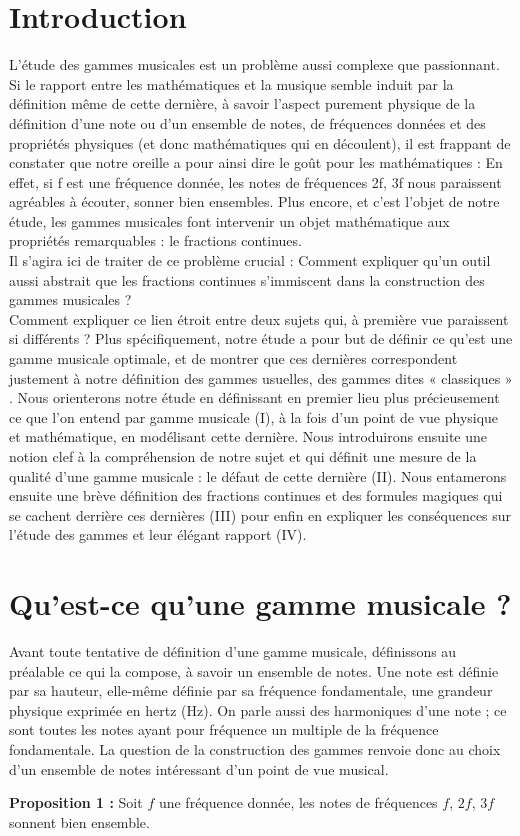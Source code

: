 \documentclass[moyen]{classeUPD}
\newenvironment{definition}{
	\begin{lrbox}{\tempbox}
		\begin{minipage}{\textwidth}
		}{
		\end{minipage}
	\end{lrbox}
	\begin{center}
		\fcolorbox[HTML]{222222}{EEEEEE}{
			\usebox{\tempbox}
		}
	\end{center}
}
\newcommand{\emf}[1]{\textbf{#1}}
\begin{document}
\chapter{Introduction}
L’étude des gammes musicales est un problème aussi complexe que passionnant. Si le rapport entre les mathématiques et la musique semble induit par la définition même de cette dernière, à savoir l’aspect purement physique de la définition d’une note ou d’un ensemble de notes, de fréquences données et des propriétés physiques (et donc mathématiques qui en découlent), il est frappant de constater que notre oreille a pour ainsi dire le goût pour les mathématiques : En effet, si f est une fréquence donnée, les notes de fréquences 2f, 3f nous paraissent agréables à écouter, sonner bien ensembles. Plus encore, et c’est l’objet de notre étude, les gammes musicales font intervenir un objet mathématique aux propriétés remarquables : le fractions continues.\\
Il s’agira ici de traiter de ce problème crucial : Comment expliquer qu’un outil aussi abstrait que les fractions continues s’immiscent dans la construction des gammes musicales ?\\
Comment expliquer ce lien étroit entre deux sujets qui, à première vue paraissent si différents ? Plus spécifiquement, notre étude a pour but de définir ce qu’est une gamme musicale optimale, et de montrer que ces dernières correspondent justement à notre définition des gammes usuelles, des gammes dites « classiques »  . Nous orienterons notre étude en définissant en premier lieu plus précieusement ce que l’on entend par gamme musicale (I), à la fois d’un point de vue physique et mathématique, en modélisant cette dernière. Nous introduirons ensuite une notion clef à la compréhension de notre sujet et qui définit une mesure de la qualité d’une gamme musicale : le défaut de cette dernière (II). Nous entamerons ensuite une brève définition des fractions continues et des formules magiques qui se cachent derrière ces dernières (III) pour enfin en expliquer les conséquences sur l’étude des gammes et leur élégant rapport (IV).

\clearpage

\chapter{Qu’est-ce qu’une gamme musicale ?}

Avant toute tentative de définition d’une gamme musicale, définissons au préalable ce qui la compose, à savoir un ensemble de notes. Une note est définie par sa hauteur, elle-même définie par sa fréquence fondamentale, une grandeur physique exprimée en hertz (Hz). On parle aussi des harmoniques d'une note ; ce sont toutes les notes ayant pour fréquence un multiple de la fréquence fondamentale. La question de la construction des gammes renvoie donc au choix d’un ensemble de notes intéressant d’un point de vue musical.
\begin{definition}
	\emf{Proposition 1 :} Soit $f$ une fréquence donnée, les notes de fréquences $f$, $2f$, $3f$ sonnent bien ensemble.\\
\end{definition}
\end{document}
